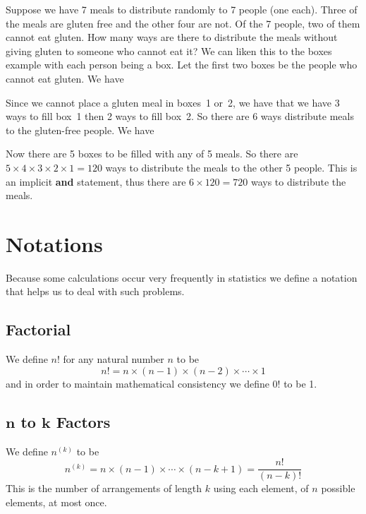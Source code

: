 \begin{example}
Suppose we have 7 meals to distribute randomly to 7 people (one each). Three of the meals are gluten free and the other four are not. Of the 7 people, two of them cannot eat gluten. How many ways are there to distribute the meals without giving gluten to someone who cannot eat it?
\tcblower
We can liken this to the boxes example with each person being a box. Let the first two boxes be the people who cannot eat gluten. We have
\begin{center}
\end{center}
Since we cannot place a gluten meal in boxes~1 or~2, we have that we have 3 ways to fill box~1 then 2 ways to fill box~2. So there are 6 ways distribute meals to the gluten-free people. We have
\begin{center}
\end{center}
Now there are 5 boxes to be filled with any of 5 meals. So there are $5 \times 4 \times 3 \times 2 \times 1 = 120$ ways to distribute the meals to the other 5 people. This is an implicit \textbf{and} statement, thus there are $6 \times 120 = 720$ ways to distribute the meals.
\end{example}
\section{Notations}
Because some calculations occur very frequently in statistics we define a notation that helps us to deal with such problems.
\subsection*{Factorial}
We define $n!$ for any natural number $n$ to be
\[
    n! = n \times (n-1) \times (n-2) \times \cdots \times 1
\]
and in order to maintain mathematical consistency we define $0!$ to be 1.
\subsection*{$\mathbf{n}$ to $\mathbf{k}$ Factors}
We define $n^{(k)}$ to be
\[
    n^{(k)} = n \times (n-1) \times \cdots \times (n-k+1) = \frac{n!}{(n-k)!}
\]
This is the number of arrangements of length $k$ using each element, of $n$ possible elements, at most once.
